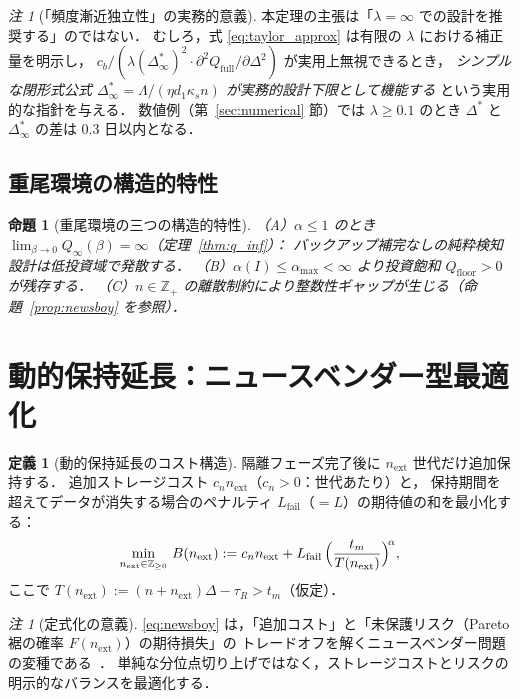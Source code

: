 \documentclass[12pt,a4paper]{article}
\theoremstyle{plain}
\newtheorem{proposition}[theorem]{命題}
\theoremstyle{definition}
\newtheorem{definition}[theorem]{定義}
\theoremstyle{remark}
\newtheorem{remark}[theorem]{注}
\newcommand{\Z}{\mathbb{Z}}
\newcommand{\Qf}{Q_{\mathrm{full}}}
\newcommand{\Qinf}{Q_{\infty}}
\newcommand{\alphI}{\alpha(I)}
\newcommand{\Dopt}{\Delta^{*}}
\newcommand{\Dinf}{\Delta^{*}_{\infty}}
\begin{document}
\begin{remark}[「頻度漸近独立性」の実務的意義]
本定理の主張は「$\lambda=\infty$ での設計を推奨する」のではない．
むしろ，式 \eqref{eq:taylor_approx} は有限の $\lambda$ における補正量を明示し，
$c_b/(\lambda(\Dinf)^2\cdot\partial^2\Qf/\partial\Delta^2)$ が実用上無視できるとき，
\emph{シンプルな閉形式公式 $\Dinf=\Lambda/(\eta d_1\kappa_s n)$ が実務的設計下限として機能する}
という実用的な指針を与える．
数値例（第~\ref{sec:numerical} 節）では $\lambda\ge0.1$ のとき $\Dopt$ と $\Dinf$ の差は 0.3 日以内となる．
\end{remark}

\subsection{重尾環境の構造的特性}

\begin{proposition}[重尾環境の三つの構造的特性]\label{prop:structural}
（A）$\alpha\le1$ のとき $\lim_{\beta\to0}\Qinf(\beta)=\infty$（定理~\ref{thm:q_inf}）：
バックアップ補完なしの純粋検知設計は低投資域で発散する．
（B）$\alphI\le\alpha_{\max}<\infty$ より投資飽和 $Q_{\mathrm{floor}}>0$ が残存する．
（C）$n\in\Z_+$ の離散制約により整数性ギャップが生じる（命題~\ref{prop:newsboy} を参照）．
\end{proposition}

\section{動的保持延長：ニュースベンダー型最適化}
\label{sec:newsboy}

\begin{definition}[動的保持延長のコスト構造]
隔離フェーズ完了後に $n_{\mathrm{ext}}$ 世代だけ追加保持する．
追加ストレージコスト $c_n n_{\mathrm{ext}}$（$c_n>0$：世代あたり）と，
保持期間を超えてデータが消失する場合のペナルティ $L_{\mathrm{fail}}$（$=L$）の期待値の和を最小化する：
\begin{equation}\label{eq:newsboy}
\min_{n_{\mathrm{ext}}\in\Z_{\ge0}}\,
B(n_{\mathrm{ext}}):=c_n n_{\mathrm{ext}}+L_{\mathrm{fail}}\,\Bigl(\frac{t_m}{T(n_{\mathrm{ext}})}\Bigr)^{\!\alpha},
\end{equation}
ここで $T(n_{\mathrm{ext}}):=(n+n_{\mathrm{ext}})\Delta-\tau_R>t_m$（仮定）．
\end{definition}

\begin{remark}[定式化の意義]
\eqref{eq:newsboy} は，「追加コスト」と「未保護リスク（Pareto 裾の確率 $F(n_{\mathrm{ext}})$）の期待損失」の
トレードオフを解くニュースベンダー問題の変種である~\cite{porteus2002}．
単純な分位点切り上げではなく，ストレージコストとリスクの明示的なバランスを最適化する．
\end{remark}
\end{document}
